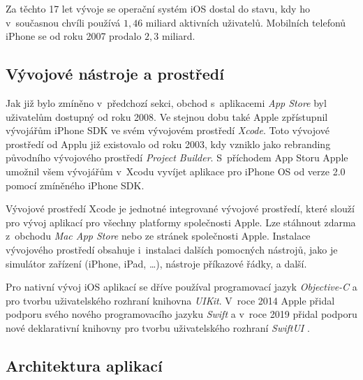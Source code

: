 Za těchto 17 let vývoje se operační systém iOS dostal do stavu, kdy ho v~současnou chvíli používá $1,46$ miliard aktivních uživatelů. Mobilních telefonů iPhone se od roku 2007 prodalo $2,3$ miliard. \cite{iphone-user-statistics}

\subsection{Vývojové nástroje a prostředí}

Jak již bylo zmíněno v~předchozí sekci, obchod s~aplikacemi \emph{App Store} byl uživatelům dostupný od roku 2008. Ve stejnou dobu také Apple zpřístupnil vývojářům iPhone SDK ve svém vývojovém prostředí \emph{Xcode}. Toto vývojové prostředí od Applu již existovalo od roku 2003, kdy vzniklo jako rebranding původního vývojového prostředí \emph{Project Builder}. S~příchodem App Storu Apple umožnil všem vývojářům v~Xcodu vyvíjet aplikace pro iPhone OS od verze 2.0 pomocí zmíněného iPhone SDK. 

Vývojové prostředí Xcode je jednotné integrované vývojové prostředí, které slouží pro vývoj aplikací pro všechny platformy společnosti Apple. Lze stáhnout zdarma z~obchodu \emph{Mac App Store} nebo ze stránek společnosti Apple. Instalace vývojového prostředí obsahuje i~instalaci dalších pomocných nástrojů, jako je simulátor zařízení (iPhone, iPad, \dots), nástroje příkazové řádky, a další. \cite{xcode-history}

Pro nativní vývoj iOS aplikací se dříve používal programovací jazyk \emph{Objective-C} \cite{objc} a pro tvorbu uživatelského rozhraní knihovna \emph{UIKit}. V~roce 2014 Apple přidal podporu svého nového programovacího jazyku \emph{Swift} \cite{swift} a v~roce 2019 přidal podporu nové deklarativní knihovny pro tvorbu uživatelského rozhraní \emph{SwiftUI} \cite{swiftui}.

\subsection{Architektura aplikací}























